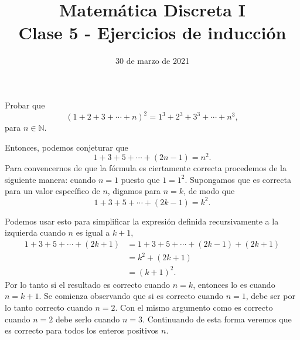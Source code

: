 \documentclass[handout]{beamer} %
\title[Clase 5 - Inducción]{Matemática Discreta I \\ Clase 5 - Ejercicios de inducción}
\institute[]{\normalsize FAMAF / UNC
	\\[\baselineskip] ${}^{}$
	\\[\baselineskip]
}
\date[30/03/2021]{30 de marzo   de 2021}
\newcommand{\N}{\mathbb N}
\begin{document}
\frame{\titlepage} 


\begin{frame}\frametitle{} 

    \begin{ejercicio}
        Probar que 
        $$
        (1 + 2+ 3 + \cdots + n)^2 = 1^3 +2^3 +3^3 + \cdots +n^3,
        $$
        para $n \in \N$.
    \end{ejercicio}

	
	
\end{frame}


\begin{frame}	
	Entonces, podemos conjeturar que\pause
	$$
	1+3+5+\cdots+(2n-1) = n^2.
	$$
	\pause
	Para convencernos de que la fórmula es ciertamente correcta procedemos de la siguiente manera: cuando $n=1$ puesto que
	$1=1^2$.\pause
	Supongamos que es correcta para un valor específico
	de $n$, digamos para $n=k$, de modo que
	$$
	1+3+5+\cdots+(2k-1) = k^2.
	$$



\end{frame}

\begin{frame}
		Podemos usar esto para simplificar la expresión definida
	recursivamente a la izquierda cuando $n$ es igual a $k+1$,\pause
	$$
	\begin{aligned}
	1+3+5+\cdots+(2k+1) &= 1+3+5+\cdots+(2k-1) +(2k+1) \\
	&=k^2 +(2k+1) \\
	&=(k+1)^2.
	\end{aligned}
	$$\pause
	Por lo tanto si el resultado es correcto cuando $n=k$, entonces lo es cuando $n=k+1$. \pause Se comienza observando que si es correcto cuando $n=1$, debe ser por lo tanto correcto cuando $n=2$. Con el mismo argumento como es correcto cuando $n=2$ debe serlo cuando $n=3$. Continuando de esta forma veremos que es correcto para todos los enteros positivos $n$.
\end{frame}

\end{document}
